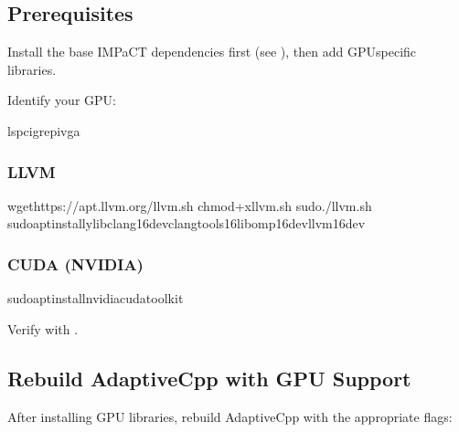 \documentclass[a4paper,10pt,english]{sphinxmanual}
\begin{document}
\subsection{Prerequisites}
\label{\detokenize{getting-started/gpu:prerequisites}}
\sphinxAtStartPar
Install the base IMPaCT dependencies first (see {\hyperref[\detokenize{getting-started/installation::doc}]{}}), then add
GPU\sphinxhyphen{}specific libraries.

\sphinxAtStartPar
Identify your GPU:

\begin{sphinxVerbatim}[commandchars=\\\{\}]
lspcigrep\PYGZhy{}ivga
\end{sphinxVerbatim}


\subsubsection{LLVM}
\label{\detokenize{getting-started/gpu:llvm}}
\begin{sphinxVerbatim}[commandchars=\\\{\}]
wgethttps://apt.llvm.org/llvm.sh
chmod+xllvm.sh
sudo./llvm.sh
sudoaptinstall\PYGZhy{}ylibclang\PYGZhy{}16\PYGZhy{}devclang\PYGZhy{}tools\PYGZhy{}16libomp\PYGZhy{}16\PYGZhy{}devllvm\PYGZhy{}16\PYGZhy{}dev
\end{sphinxVerbatim}


\subsubsection{CUDA (NVIDIA)}
\label{\detokenize{getting-started/gpu:cuda-nvidia}}
\begin{sphinxVerbatim}[commandchars=\\\{\}]
sudoaptinstallnvidia\PYGZhy{}cuda\PYGZhy{}toolkit
\end{sphinxVerbatim}

\sphinxAtStartPar
Verify with .


\subsection{Rebuild AdaptiveCpp with GPU Support}
\label{\detokenize{getting-started/gpu:rebuild-adaptivecpp-with-gpu-support}}
\sphinxAtStartPar
After installing GPU libraries, rebuild AdaptiveCpp with the appropriate flags:
\end{document}

